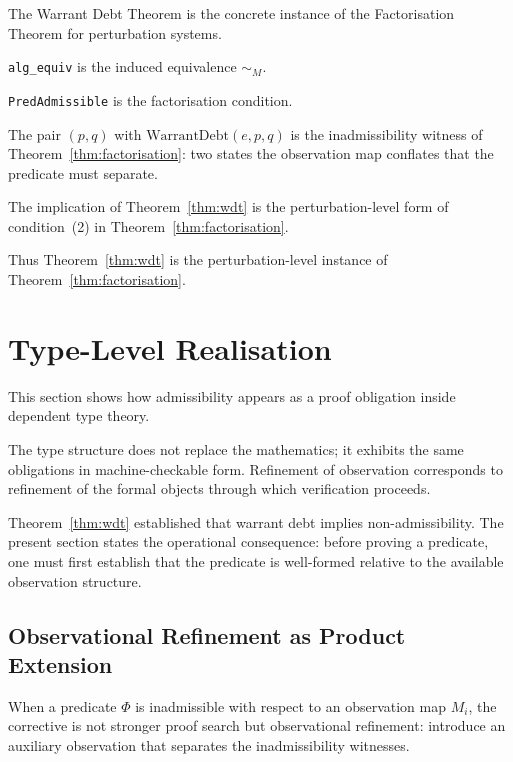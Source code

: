 \documentclass[pdflatex,sn-mathphys-num]{sn-jnl}
\theoremstyle{plain}
\theoremstyle{definition}
\theoremstyle{remark}
\newcommand{\WD}{\mathrm{WarrantDebt}}
\begin{document}
The Warrant Debt Theorem is the concrete instance of the Factorisation
Theorem for perturbation systems.

\texttt{alg\_equiv} is the induced equivalence $\sim_M$.

\texttt{PredAdmissible} is the factorisation condition.

The pair $(p,q)$ with $\WD(e,p,q)$ is the inadmissibility witness of
Theorem~\ref{thm:factorisation}: two states the observation map
conflates that the predicate must separate.

The implication of Theorem~\ref{thm:wdt} is the perturbation-level
form of condition~(2) in Theorem~\ref{thm:factorisation}.

Thus Theorem~\ref{thm:wdt} is the perturbation-level instance of
Theorem~\ref{thm:factorisation}.

\section{Type-Level Realisation}
\label{sec:type}

This section shows how admissibility appears as a proof obligation
inside dependent type theory.

The type structure does not replace the mathematics; it exhibits the
same obligations in machine-checkable form.
Refinement of observation corresponds to refinement of the formal
objects through which verification proceeds.

Theorem~\ref{thm:wdt} established that warrant debt implies
non-admissibility.
The present section states the operational consequence: before proving
a predicate, one must first establish that the predicate is
well-formed relative to the available observation structure.

\subsection{Observational Refinement as Product Extension}

When a predicate $\Phi$ is inadmissible with respect to an observation
map $M_i$, the corrective is not stronger proof search but
observational refinement: introduce an auxiliary observation that
separates the inadmissibility witnesses.
\end{document}
